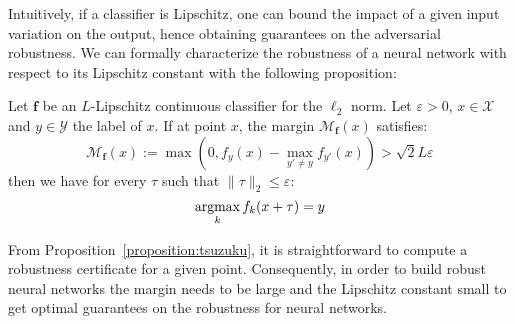 Intuitively, if a classifier is Lipschitz, one can bound the impact of a given input variation on the output, hence obtaining guarantees on the adversarial robustness.
We can formally characterize the robustness of a neural network with respect to its Lipschitz constant with the following proposition:
\begin{prop} \label{proposition:tsuzuku}
Let $\mathbf{f}$ be an $L$-Lipschitz continuous classifier for the $\ell_2$ norm.
Let $\varepsilon > 0$, $x \in \mathcal{X}$ and $y \in \mathcal{Y}$ the label of $x$.
If at point $x$, the margin $\mathcal{M}_{\mathbf{f}}(x)$ satisfies:
\begin{equation*}
  \mathcal{M}_{\mathbf{f}}(x):=\max(0,f_y(x)-\max_{y'\neq y}f_{y'}(x)) > \sqrt{2} L \varepsilon
\end{equation*}
then we have for every $\tau$ such that $\lVert \tau \rVert_2 \leq \varepsilon$:
\begin{equation*}
  \operatorname*{argmax}_{k}f_k(x + \tau) = y
\end{equation*}
\end{prop}
From Proposition~\ref{proposition:tsuzuku}, it is straightforward to compute a robustness certificate for a given point.
Consequently, in order to build robust neural networks the margin needs to be large and the Lipschitz constant small to get optimal guarantees on the robustness for neural networks.


